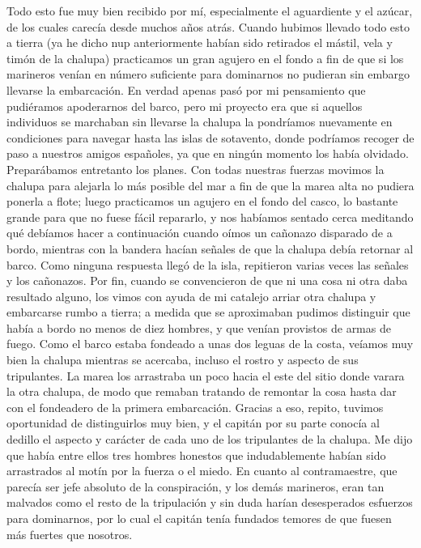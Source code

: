 \documentclass{novela}
\begin{document}
    Todo esto fue muy bien recibido por mí, especialmente el aguardiente y el azúcar, de los cuales carecía desde muchos años atrás.
    Cuando hubimos llevado todo esto a tierra (ya he dicho nup anteriormente habían sido retirados el mástil, vela y timón de la chalupa) practicamos un gran agujero en el fondo a fin de que si los marineros venían en número suficiente para dominarnos no pudieran sin embargo llevarse la embarcación.
    En verdad apenas pasó por mi pensamiento que pudiéramos apoderarnos del barco, pero mi proyecto era que si aquellos individuos se marchaban sin llevarse la chalupa la pondríamos nuevamente en condiciones para navegar hasta las islas de sotavento, donde podríamos recoger de paso a nuestros amigos españoles, ya que en ningún momento los había olvidado.
    Preparábamos entretanto los planes. Con todas nuestras fuerzas movimos la chalupa para alejarla lo más posible del mar a fin de que la marea alta no pudiera ponerla a flote; luego practicamos un agujero en el fondo del casco, lo bastante grande para que no fuese fácil repararlo, y nos habíamos sentado cerca meditando qué debíamos hacer a continuación cuando oímos un cañonazo disparado de a bordo, mientras con la bandera hacían señales de que la chalupa debía retornar al barco.
    Como ninguna respuesta llegó de la isla, repitieron varias veces las señales y los cañonazos.
    Por fin, cuando se convencieron de que ni una cosa ni otra daba resultado alguno, los vimos con ayuda de mi catalejo arriar otra chalupa y embarcarse rumbo a tierra; a medida que se aproximaban pudimos distinguir que había a bordo no menos de diez hombres, y que venían provistos de armas de fuego.
    Como el barco estaba fondeado a unas dos leguas de la costa, veíamos muy bien la chalupa mientras se acercaba, incluso el rostro y aspecto de sus tripulantes. La marea los arrastraba un poco hacia el este del sitio donde varara la otra chalupa, de modo que remaban tratando de remontar la cosa hasta dar con el fondeadero de la primera embarcación.
    Gracias a eso, repito, tuvimos oportunidad de distinguirlos muy bien, y el capitán por su parte conocía al dedillo el aspecto y carácter de cada uno de los tripulantes de la chalupa. Me dijo que había entre ellos tres hombres honestos que indudablemente habían sido arrastrados al motín por la fuerza o el miedo. En cuanto al contramaestre, que parecía ser jefe absoluto de la conspiración, y los demás marineros, eran tan malvados como el resto de la tripulación y sin duda harían desesperados esfuerzos para dominarnos, por lo cual el capitán tenía fundados temores de que fuesen más fuertes que nosotros.
\end{document}
